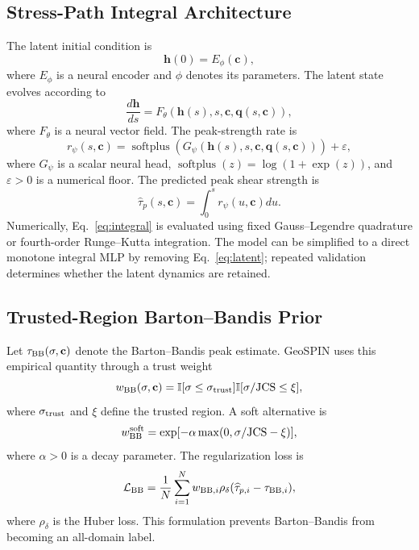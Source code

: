 \documentclass[journal]{IEEEtran}
\begin{document}
\subsection{Stress-Path Integral Architecture}
The latent initial condition is
\begin{equation}
\mathbf{h}(0)=E_{\phi}(\mathbf{c}),
\label{eq:h0}
\end{equation}
where $E_{\phi}$ is a neural encoder and $\phi$ denotes its parameters. The latent state evolves according to
\begin{equation}
\frac{d\mathbf{h}}{ds}=F_{\theta}\left(\mathbf{h}(s),s,\mathbf{c},\mathbf{q}(s,\mathbf{c})\right),
\label{eq:latent}
\end{equation}
where $F_{\theta}$ is a neural vector field. The peak-strength rate is
\begin{equation}
r_{\psi}(s,\mathbf{c})=\operatorname{softplus}\left(G_{\psi}(\mathbf{h}(s),s,\mathbf{c},\mathbf{q}(s,\mathbf{c}))\right)+\varepsilon,
\label{eq:rate}
\end{equation}
where $G_{\psi}$ is a scalar neural head, $\operatorname{softplus}(z)=\log(1+\exp(z))$, and $\varepsilon>0$ is a numerical floor. The predicted peak shear strength is
\begin{equation}
\widehat{\tau}_p(s,\mathbf{c})=\int_0^s r_{\psi}(u,\mathbf{c})du.
\label{eq:integral}
\end{equation}
Numerically, Eq.~\eqref{eq:integral} is evaluated using fixed Gauss--Legendre quadrature or fourth-order Runge--Kutta integration. The model can be simplified to a direct monotone integral MLP by removing Eq.~\eqref{eq:latent}; repeated validation determines whether the latent dynamics are retained.

\subsection{Trusted-Region Barton--Bandis Prior}
Let $\tau_{\rm BB}(\sigma,
\mathbf{c})$ denote the Barton--Bandis peak estimate. GeoSPIN uses this empirical quantity through a trust weight
\begin{equation}
w_{\rm BB}(\sigma,\mathbf{c})=\mathbb{I}[\sigma\le\sigma_{\rm trust}]\mathbb{I}[\sigma/\mathrm{JCS}\le\xi],
\label{eq:wbb}
\end{equation}
where $\sigma_{\rm trust}$ and $\xi$ define the trusted region. A soft alternative is
\begin{equation}
w_{\rm BB}^{\rm soft}=\exp[-\alpha\max(0,\sigma/\mathrm{JCS}-\xi)],
\label{eq:wbbsoft}
\end{equation}
where $\alpha>0$ is a decay parameter. The regularization loss is
\begin{equation}
\mathcal{L}_{\rm BB}=\frac{1}{N}\sum_{i=1}^{N}w_{{\rm BB},i}\rho_{\delta}(\widehat{\tau}_{p,i}-\tau_{{\rm BB},i}),
\label{eq:lbb}
\end{equation}
where $\rho_{\delta}$ is the Huber loss. This formulation prevents Barton--Bandis from becoming an all-domain label.
\end{document}
